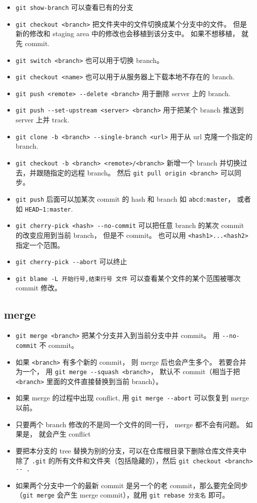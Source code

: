 \begin{itemize}
\item \verb`git show-branch` 可以查看已有的分支 
\item \verb`git checkout <branch>` 把文件夹中的文件切换成某个分支中的文件。 但是新的修改和 staging area 中的修改也会移植到该分支中。 如果不想移植， 就先 commit.
\item \verb`git switch <branch>` 也可以用于切换 branch。
\item \verb`git checkout <name>` 也可以用于从服务器上下载本地不存在的 branch.
\item \verb`git push <remote> --delete <branch>` 用于删除 server 上的 branch.
\item \verb`git push --set-upstream <server> <branch>` 用于把某个 branch 推送到 server 上并 track.
\item \verb`git clone -b <branch> --single-branch <url>` 用于从 url 克隆一个指定的 branch.
\item \verb`git checkout -b <branch> <remote>/<branch>` 新增一个 branch 并切换过去，并跟随指定的远程 branch。 然后 \verb`git pull origin <branch>` 可以同步。
\item \verb`git push` 后面可以加某次 commit 的 hash 和 branch 如 \verb`abcd:master`， 或者如 \verb`HEAD~1:master`.
\item \verb`git cherry-pick <hash> --no-commit` 可以把任意 branch 的某次 commit 的改变应用到当前 branch， 但是不 commit。 也可以用 \verb`<hash1>...<hash2>` 指定一个范围。
\item \verb`git cherry-pick --abort` 可以终止
\item \verb`git blame -L 开始行号,结束行号 文件`  可以查看某个文件的某个范围被哪次 commit 修改。
\end{itemize}

\subsection{merge}
\begin{itemize}
\item \verb`git merge <branch>` 把某个分支并入到当前分支中并 commit。 用 \verb`--no-commit` 不 commit。
\item 如果 \verb`<branch>` 有多个新的 commit， 则 merge 后也会产生多个。 若要合并为一个， 用 \verb`git merge --squash <branch>`， 默认不 commit（相当于把 \verb`<branch>` 里面的文件直接替换到当前 branch）。
\item 如果 merge 的过程中出现 conflict, 用 \verb`git merge --abort` 可以恢复到 merge 以前。
\item 只要两个 branch 修改的不是同一个文件的同一行， merge 都不会有问题。 如果是， 就会产生 conflict
\item 要把本分支的 tree 替换为别的分支，可以在仓库根目录下删除仓库文件夹中除了 \verb`.git` 的所有文件和文件夹（包括隐藏的），然后 \verb`git checkout <branch> -- .`
\item 如果两个分支中一个的最新 commit 是另一个的老 commit，那么要完全同步（\verb`git merge` 会产生 merge commit），就用 \verb`git rebase 分支名` 即可。
\end{itemize}


